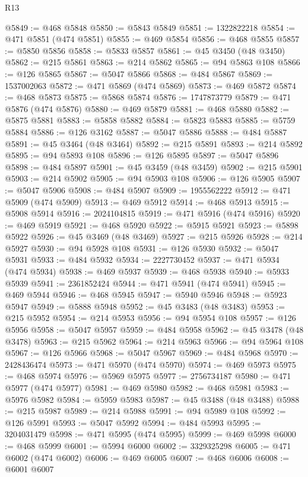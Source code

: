 \begin{lexlean}{R13}
\begin{coremodule}
@5849 := @468 @5848
@5850 := @5843 @5849
@5851 := 1322822218
@5854 := @471 @5851 (@474 @5851)
@5855 := @469 @5854
@5856 := @468 @5855
@5857 := @5850 @5856
@5858 := @5833 @5857
@5861 := @45 @3450 (@48 @3450)
@5862 := @215 @5861
@5863 := @214 @5862
@5865 := @94 @5863 @108
@5866 := @126 @5865
@5867 := @5047 @5866
@5868 := @484 @5867
@5869 := 1537002063
@5872 := @471 @5869 (@474 @5869)
@5873 := @469 @5872
@5874 := @468 @5873
@5875 := @5868 @5874
@5876 := 1747873779
@5879 := @471 @5876 (@474 @5876)
@5880 := @469 @5879
@5881 := @468 @5880
@5882 := @5875 @5881
@5883 := @5858 @5882
@5884 := @5823 @5883
@5885 := @5759 @5884
@5886 := @126 @3162
@5887 := @5047 @5886
@5888 := @484 @5887
@5891 := @45 @3464 (@48 @3464)
@5892 := @215 @5891
@5893 := @214 @5892
@5895 := @94 @5893 @108
@5896 := @126 @5895
@5897 := @5047 @5896
@5898 := @484 @5897
@5901 := @45 @3459 (@48 @3459)
@5902 := @215 @5901
@5903 := @214 @5902
@5905 := @94 @5903 @108
@5906 := @126 @5905
@5907 := @5047 @5906
@5908 := @484 @5907
@5909 := 1955562222
@5912 := @471 @5909 (@474 @5909)
@5913 := @469 @5912
@5914 := @468 @5913
@5915 := @5908 @5914
@5916 := 2024104815
@5919 := @471 @5916 (@474 @5916)
@5920 := @469 @5919
@5921 := @468 @5920
@5922 := @5915 @5921
@5923 := @5898 @5922
@5926 := @45 @3469 (@48 @3469)
@5927 := @215 @5926
@5928 := @214 @5927
@5930 := @94 @5928 @108
@5931 := @126 @5930
@5932 := @5047 @5931
@5933 := @484 @5932
@5934 := 2227730452
@5937 := @471 @5934 (@474 @5934)
@5938 := @469 @5937
@5939 := @468 @5938
@5940 := @5933 @5939
@5941 := 2361852424
@5944 := @471 @5941 (@474 @5941)
@5945 := @469 @5944
@5946 := @468 @5945
@5947 := @5940 @5946
@5948 := @5923 @5947
@5949 := @5888 @5948
@5952 := @45 @3483 (@48 @3483)
@5953 := @215 @5952
@5954 := @214 @5953
@5956 := @94 @5954 @108
@5957 := @126 @5956
@5958 := @5047 @5957
@5959 := @484 @5958
@5962 := @45 @3478 (@48 @3478)
@5963 := @215 @5962
@5964 := @214 @5963
@5966 := @94 @5964 @108
@5967 := @126 @5966
@5968 := @5047 @5967
@5969 := @484 @5968
@5970 := 2428436474
@5973 := @471 @5970 (@474 @5970)
@5974 := @469 @5973
@5975 := @468 @5974
@5976 := @5969 @5975
@5977 := 2756734187
@5980 := @471 @5977 (@474 @5977)
@5981 := @469 @5980
@5982 := @468 @5981
@5983 := @5976 @5982
@5984 := @5959 @5983
@5987 := @45 @3488 (@48 @3488)
@5988 := @215 @5987
@5989 := @214 @5988
@5991 := @94 @5989 @108
@5992 := @126 @5991
@5993 := @5047 @5992
@5994 := @484 @5993
@5995 := 3204031479
@5998 := @471 @5995 (@474 @5995)
@5999 := @469 @5998
@6000 := @468 @5999
@6001 := @5994 @6000
@6002 := 3329325298
@6005 := @471 @6002 (@474 @6002)
@6006 := @469 @6005
@6007 := @468 @6006
@6008 := @6001 @6007

\end{coremodule}
\end{lexlean}
